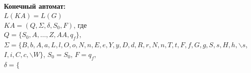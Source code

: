 \documentclass[a4paper,10pt]{article}
\begin{document}
	
	\text{} \\
	\textbf{Конечный автомат:} \\[3mm]
	\hspace*{5mm} $L(KA) = L(G)$ \\[2mm]
	\hspace*{5mm} $KA = (Q, \varSigma, \delta, S_0, F)$, где \\[2mm]
	\hspace*{5mm} $Q = \{ S_0, A, \dots, Z, AA, q_f \}$, $\varSigma = \{ B, b, A, a, L, l, O, o, N, n, E, e, Y, y, D, d, R, r, N, n, T, t, F, f, G, g, S, s, H, h, \backslash s$,
	\\ \hspace*{5mm }$ I, i, C, c, \backslash W \}$, $S_0=S_0$, $F=q_f$, \\[2mm]
	\hspace*{5mm} $\delta = \{ $
\end{document}
